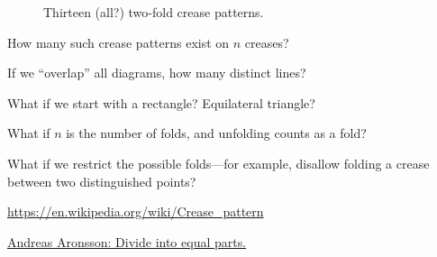 \documentclass{article}
\begin{document}
\begin{figure}[ht!]

  \caption{
    Thirteen (all?) two-fold crease patterns.
  }
\end{figure}
\begin{question}
  How many such crease patterns exist on $n$ creases?
\end{question}

\begin{related}
  \item If we ``overlap'' all diagrams, how many distinct lines?
  \item What if we start with a rectangle? Equilateral triangle?
  \item What if $n$ is the number of folds, and unfolding counts as a fold?
  \item What if we restrict the possible folds---for example, disallow folding
  a crease between two distinguished points?
\end{related}
\begin{references}
  \item \url{https://en.wikipedia.org/wiki/Crease_pattern}
  \item \href{http://andreasaronsson.com/guides/perspective-drawing/divide-into-equal-parts/}{Andreas Aronsson: Divide into equal parts.}
\end{references}
\end{document}
